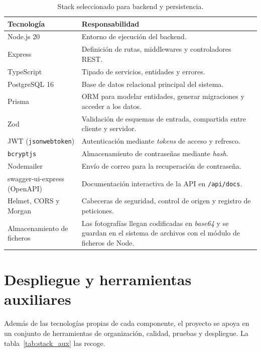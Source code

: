 \begin{table}[H]
  \centering
  \caption{Stack seleccionado para backend y persistencia.}
  \label{tab:stack_backend}
  \begin{tabularx}{\textwidth}{lX}
    \toprule
    \textbf{Tecnología} & \textbf{Responsabilidad} \\
    \midrule
    Node.js 20 & Entorno de ejecución del backend. \\
    Express & Definición de rutas, middlewares y controladores REST. \\
    TypeScript & Tipado de servicios, entidades y errores. \\
    PostgreSQL 16 & Base de datos relacional principal del sistema. \\
    Prisma & ORM para modelar entidades, generar migraciones y acceder a los datos. \\
    Zod & Validación de esquemas de entrada, compartida entre cliente y servidor. \\
    JWT (\texttt{jsonwebtoken}) & Autenticación mediante \textit{tokens} de acceso y refresco. \\
    \texttt{bcryptjs} & Almacenamiento de contraseñas mediante \textit{hash}. \\
    Nodemailer & Envío de correo para la recuperación de contraseña. \\
    swagger-ui-express (OpenAPI) & Documentación interactiva de la API en \texttt{/api/docs}. \\
    Helmet, CORS y Morgan & Cabeceras de seguridad, control de origen y registro de peticiones. \\
    Almacenamiento de ficheros & Las fotografías llegan codificadas en \textit{base64} y se guardan en el sistema de archivos con el módulo de ficheros de Node. \\
    \bottomrule
  \end{tabularx}
\end{table}

\section{Despliegue y herramientas auxiliares}

Además de las tecnologías propias de cada componente, el proyecto se apoya en un
conjunto de herramientas de organización, calidad, pruebas y despliegue. La
tabla~\ref{tab:stack_aux} las recoge.

